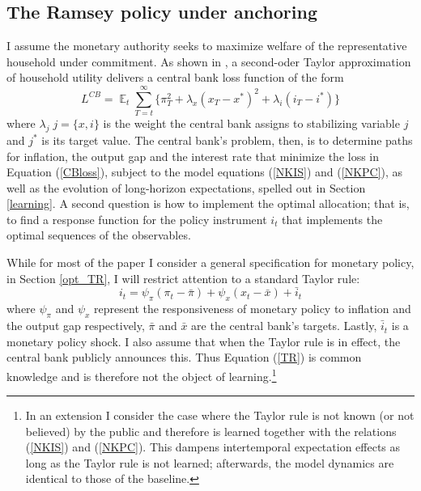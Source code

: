\documentclass[11pt]{article}
\renewcommand{\[}{\begin{equation}}
\renewcommand{\]}{\end{equation}}
\DeclareMathOperator{\E}{\mathbb{E}}
\begin{document}
\subsection{The Ramsey policy under anchoring}\label{ramsey}
I assume the monetary authority seeks to maximize welfare of the representative household under commitment. As shown in \cite{woodford2011interest}, a second-oder Taylor approximation of household utility delivers a central bank loss function of the form
\begin{equation}
L^{CB} =\E_t \sum_{T=t}^{\infty}\{\pi_T^2 +\lambda_x(x_T - x^*)^2 +\lambda_i(i_T - i^*)\} \label{CBloss}
\end{equation}
where $\lambda_j \; j=\{x,i\}$ is the weight the central bank assigns to stabilizing variable $j$ and $j^*$ is its target value. The central bank's problem, then, is to determine paths for inflation, the output gap and the interest rate that minimize the loss in Equation (\ref{CBloss}), subject to the model equations (\ref{NKIS}) and (\ref{NKPC}), as well as the evolution of long-horizon expectations, spelled out in Section \ref{learning}. A second question is how to implement the optimal allocation; that is, to find a response function for the policy instrument $i_t$ that implements the optimal sequences of the observables.

While for most of the paper I consider a general specification for monetary policy, in Section \ref{opt_TR}, I will restrict attention to a standard Taylor rule:
\begin{equation}
i_t = \psi_{\pi}(\pi_t -\bar{\pi}) + \psi_{x} (x_t -\bar{x}) + \bar{i}_t  \label{TR}
\end{equation}
where $\psi_{\pi}$ and $\psi_{x}$ represent the responsiveness of monetary policy to inflation and the output gap respectively, $\bar{\pi}$ and $\bar{x}$ are the central bank's targets. Lastly, $\bar{i}_t$ is a monetary policy shock. I also assume that when the Taylor rule is in effect, the central bank publicly announces this. Thus Equation (\ref{TR}) is common knowledge and is therefore not the object of learning.\footnote{In an extension I consider the case where the Taylor rule is not known (or not believed) by the public and therefore is learned together with the relations (\ref{NKIS}) and (\ref{NKPC}). This dampens intertemporal expectation effects as long as the Taylor rule is not learned; afterwards, the model dynamics are identical to those of the baseline.} 
 

\end{document}
